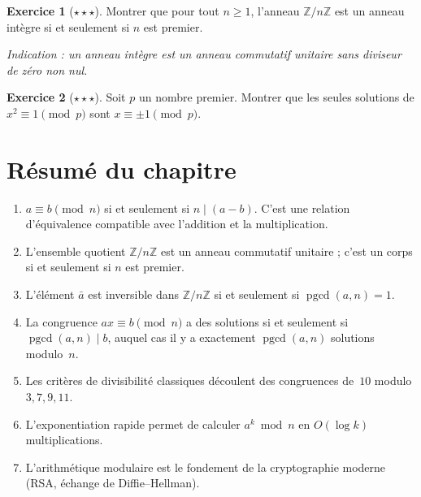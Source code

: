 \documentclass[12pt,a4paper,openany]{book}
\theoremstyle{definition}
\newtheorem{exercice}{Exercice}[chapter]
\theoremstyle{plain}
\theoremstyle{remark}
\newcommand{\Z}{\mathbb{Z}}
\DeclareMathOperator{\pgcd}{pgcd}
\begin{document}
\begin{exercice}[$\star\star\star$]
\label{exo:cong-10}
Montrer que pour tout $n \geqslant 1$, l'anneau $\Z/n\Z$ est un anneau intègre
si et seulement si $n$ est premier.

\emph{Indication : un anneau intègre est un anneau commutatif unitaire sans diviseur
de zéro non nul.}
\end{exercice}

\begin{exercice}[$\star\star\star$]
\label{exo:cong-11}
Soit $p$ un nombre premier. Montrer que les seules solutions de $x^2 \equiv 1 \pmod{p}$
sont $x \equiv \pm 1 \pmod{p}$.
\end{exercice}

\section*{Résumé du chapitre}
\label{sec:cong-resume}

\begin{enumerate}
  \item $a \equiv b \pmod{n}$ si et seulement si $n \mid (a - b)$. C'est une
    relation d'équivalence compatible avec l'addition et la multiplication.
  \item L'ensemble quotient $\Z/n\Z$ est un anneau commutatif unitaire ; c'est un
    corps si et seulement si $n$ est premier.
  \item L'élément $\bar{a}$ est inversible dans $\Z/n\Z$ si et seulement si
    $\pgcd(a, n) = 1$.
  \item La congruence $ax \equiv b \pmod{n}$ a des solutions si et seulement si
    $\pgcd(a, n) \mid b$, auquel cas il y a exactement $\pgcd(a, n)$ solutions
    modulo~$n$.
  \item Les critères de divisibilité classiques découlent des congruences de~$10$
    modulo $3, 7, 9, 11$.
  \item L'exponentiation rapide permet de calculer $a^k \bmod n$ en $O(\log k)$
    multiplications.
  \item L'arithmétique modulaire est le fondement de la cryptographie moderne (RSA,
    échange de Diffie--Hellman).
\end{enumerate}

\newpage

\end{document}
